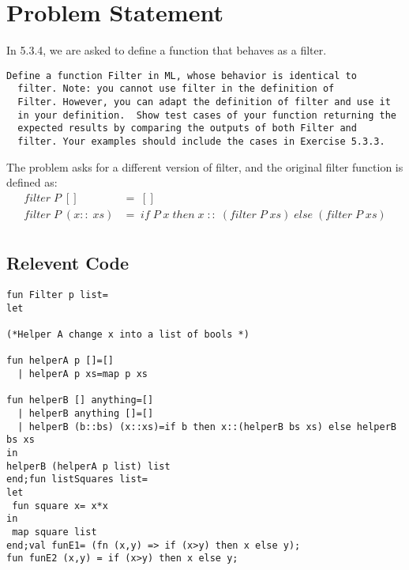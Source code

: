\documentclass{report}
\begin{document}

\section{Problem Statement}
\label{sec:problem-statement-1}

In 5.3.4, we are asked to define a function that behaves as a filter.
\lstset{frameround=ffff}
\begin{lstlisting}[frame=trbl]
  Define a function Filter in ML, whose behavior is identical to
  filter. Note: you cannot use filter in the definition of
  Filter. However, you can adapt the definition of filter and use it
  in your definition.  Show test cases of your function returning the
  expected results by comparing the outputs of both Filter and
  filter. Your examples should include the cases in Exercise 5.3.3.
\end{lstlisting}
The problem asks for a different version of filter, and the original filter function is defined as:
\begin{align*}
  filter\; P\; []\; &=\; []\\
  filter\; P\;(x::\;xs)&=\;if\;P\;x\;then\;x\;::\;(filter\;P\;xs)\;else\;(filter\;P\;xs)\\
\end{align*}

\subsection{Relevent Code}
\label{sec:relevent-code-1}

\begin{lstlisting}[frame=TRBL]
fun Filter p list=
let

(*Helper A change x into a list of bools *)

fun helperA p []=[]
  | helperA p xs=map p xs

fun helperB [] anything=[]
  | helperB anything []=[]
  | helperB (b::bs) (x::xs)=if b then x::(helperB bs xs) else helperB bs xs
in
helperB (helperA p list) list
end;fun listSquares list=
let
 fun square x= x*x
in
 map square list
end;val funE1= (fn (x,y) => if (x>y) then x else y);
fun funE2 (x,y) = if (x>y) then x else y;
\end{lstlisting}
\end{document}

